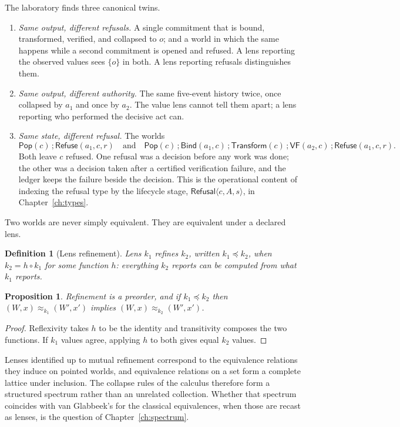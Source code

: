 \documentclass[11pt,openany]{book}
\newtheorem{proposition}[theorem]{Proposition}
\newtheorem{definition}[theorem]{Definition}
\theoremstyle{remark}
\newcommand{\Pop}{\mathsf{Pop}}
\newcommand{\Refuse}{\mathsf{Refuse}}
\newcommand{\Bind}{\mathsf{Bind}}
\newcommand{\Transform}{\mathsf{Transform}}
\begin{document}
The laboratory finds three canonical twins.
\begin{enumerate}[leftmargin=1.5em]
\item \emph{Same output, different refusals.} A single commitment that is
bound, transformed, verified, and collapsed to $o$; and a world in which the
same happens while a second commitment is opened and refused. A lens
reporting the observed values sees $\{o\}$ in both. A lens reporting
refusals distinguishes them.
\item \emph{Same output, different authority.} The same five-event history
twice, once collapsed by $a_1$ and once by $a_2$. The value lens cannot
tell them apart; a lens reporting who performed the decisive act can.
\item \emph{Same state, different refusal.} The worlds
\[
\Pop(c)\,;\Refuse(a_1,c,r)
\quad\text{and}\quad
\Pop(c)\,;\Bind(a_1,c)\,;\Transform(c)\,;\mathsf{VF}(a_2,c)\,;\Refuse(a_1,c,r).
\]
Both
leave $c$ refused. One refusal was a decision before any work was done;
the other was a decision taken after a certified verification failure,
and the ledger keeps the failure beside the decision.
This is the operational content of indexing the refusal type by the
lifecycle stage, $\mathsf{Refusal}\langle c,A,s\rangle$, in
Chapter~\ref{ch:types}.
\end{enumerate}
Two worlds are never simply equivalent. They are equivalent under a
declared lens.

\begin{definition}[Lens refinement]
Lens $k_1$ \emph{refines} $k_2$, written $k_1\preceq k_2$, when
$k_2=h\circ k_1$ for some function $h$: everything $k_2$ reports can be
computed from what $k_1$ reports.
\end{definition}

\begin{proposition}\label{prop:lens}
Refinement is a preorder, and if $k_1\preceq k_2$ then
$(W,x)\approx_{k_1}(W',x')$ implies $(W,x)\approx_{k_2}(W',x')$.
\end{proposition}

\begin{proof}
Reflexivity takes $h$ to be the identity and transitivity composes the
two functions. If $k_1$ values agree, applying $h$ to both gives equal
$k_2$ values.
\end{proof}

Lenses identified up to mutual refinement correspond to the equivalence
relations they induce on pointed worlds, and equivalence relations on a
set form a complete lattice under inclusion. The collapse rules of the
calculus therefore form a structured spectrum rather than an unrelated
collection. Whether that spectrum coincides with van Glabbeek's for the
classical equivalences, when those are recast as lenses, is the question
of Chapter~\ref{ch:spectrum}.
\end{document}
